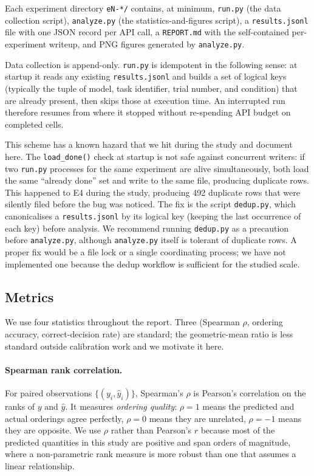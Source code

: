 \documentclass[11pt]{article}
\newcommand{\code}[1]{\texttt{\small #1}}
\begin{document}
Each experiment directory \code{eN-*/} contains, at minimum, \code{run.py} (the data
collection script), \code{analyze.py} (the statistics-and-figures script), a
\code{results.jsonl} file with one JSON record per API call, a \code{REPORT.md} with the
self-contained per-experiment writeup, and PNG figures generated by \code{analyze.py}.

Data collection is append-only. \code{run.py} is idempotent in the following sense: at startup
it reads any existing \code{results.jsonl} and builds a set of logical keys (typically the
tuple of model, task identifier, trial number, and condition) that are already present,
then skips those at execution time. An interrupted run therefore resumes from where it stopped
without re-spending API budget on completed cells.

This scheme has a known hazard that we hit during the study and document here. The
\code{load\_done()} check at startup is not safe against concurrent writers: if two
\code{run.py} processes for the same experiment are alive simultaneously, both load the same
``already done'' set and write to the same file, producing duplicate rows. This happened to
E4 during the study, producing 492 duplicate rows that were silently filed before the bug was
noticed. The fix is the script \code{dedup.py}, which canonicalises a \code{results.jsonl} by
its logical key (keeping the last occurrence of each key) before analysis. We recommend
running \code{dedup.py} as a precaution before \code{analyze.py}, although \code{analyze.py}
itself is tolerant of duplicate rows. A proper fix would be a file lock or a single
coordinating process; we have not implemented one because the dedup workflow is sufficient
for the studied scale.

\subsection{Metrics}
\label{sec:metrics}

We use four statistics throughout the report. Three (Spearman $\rho$, ordering accuracy,
correct-decision rate) are standard; the geometric-mean ratio is less standard outside
calibration work and we motivate it here.

\paragraph{Spearman rank correlation.} For paired observations
$\{(y_i, \hat{y}_i)\}$, Spearman's $\rho$ is Pearson's correlation on the ranks of $y$ and
$\hat{y}$. It measures \emph{ordering quality}: $\rho = 1$ means the predicted and actual
orderings agree perfectly, $\rho = 0$ means they are unrelated, $\rho = -1$ means they are
opposite. We use $\rho$ rather than Pearson's $r$ because most of the predicted quantities
in this study are positive and span orders of magnitude, where a non-parametric rank measure
is more robust than one that assumes a linear relationship.
\end{document}
